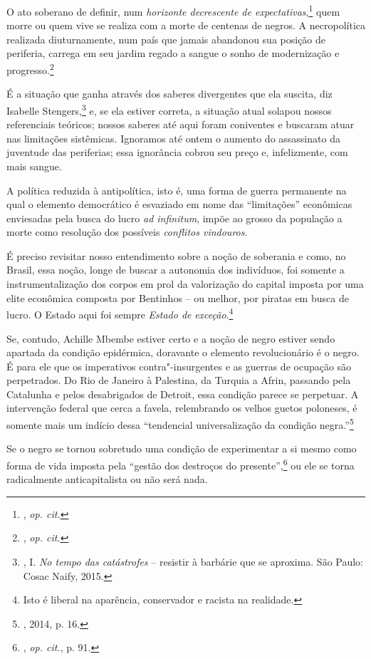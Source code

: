 O ato soberano de definir, num \emph{horizonte decrescente de
expectativas},\footnote{, \emph{op. cit.}} quem morre ou quem vive se
realiza com a morte de centenas de negros. A necropolítica realizada
diuturnamente, num país que jamais abandonou sua posição de periferia,
carrega em seu jardim regado a sangue o sonho de modernização e
progresso.\footnote{, \emph{op. cit.}}

É a situação que ganha através dos saberes divergentes que ela suscita,
diz Isabelle Stengers,\footnote{, I. \emph{No tempo das
  catástrofes} -- resistir à barbárie que se aproxima. São Paulo: Cosac
  Naify, 2015.} e, se ela estiver correta, a situação atual solapou
nossos referenciais teóricos; nossos saberes até aqui foram coniventes e
buscaram atuar nas limitações sistêmicas. Ignoramos até ontem o aumento
do assassinato da juventude das periferias; essa ignorância cobrou seu
preço e, infelizmente, com mais sangue.

A política reduzida à antipolítica, isto é, uma forma de guerra
permanente na qual o elemento democrático é esvaziado em nome das
``limitações'' econômicas enviesadas pela busca do lucro \emph{ad
infinitum}, impõe ao grosso da população a morte como resolução dos
possíveis \emph{conflitos vindouros}.

É preciso revisitar nosso entendimento sobre a noção de soberania e
como, no Brasil, essa noção, longe de buscar a autonomia dos indivíduos,
foi somente a instrumentalização dos corpos em prol da valorização do
capital imposta por uma elite econômica composta por Bentinhos -- ou
melhor, por piratas em busca de lucro. O Estado aqui foi sempre
\emph{Estado de} \emph{exceção}.\footnote{Isto
  é liberal na aparência, conservador e racista na realidade.}

Se, contudo, Achille Mbembe estiver certo e a noção de negro estiver
sendo apartada da condição epidérmica, doravante o elemento
revolucionário é o negro. É para ele que os imperativos
contra"-insurgentes e as guerras de ocupação são perpetrados. Do Rio de
Janeiro à Palestina, da Turquia a Afrin, passando pela Catalunha e pelos
desabrigados de Detroit, essa condição parece se perpetuar. A
intervenção federal que cerca a favela, relembrando os velhos guetos
poloneses, é somente mais um indício dessa ``tendencial universalização
da condição negra.''\footnote{, 2014, p. 16.}

Se o negro se tornou sobretudo uma condição de experimentar a si mesmo
como forma de vida imposta pela ``gestão dos destroços do
presente'',\footnote{, \emph{op. cit.}, p. 91.} ou ele se torna
radicalmente anticapitalista ou não será nada.

